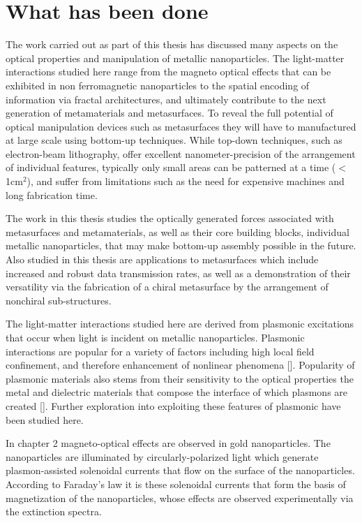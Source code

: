 \section{What has been done}
The work carried out as part of this thesis has discussed many aspects on the optical properties and manipulation of metallic nanoparticles. The light-matter interactions studied here range from the magneto optical effects that can be exhibited in non ferromagnetic nanoparticles to the spatial encoding of information via fractal architectures, and ultimately contribute to the next generation of metamaterials and metasurfaces. To reveal the full potential of optical manipulation devices such as metasurfaces they will have to manufactured at large scale using bottom-up techniques. While top-down techniques, such as electron-beam lithography, offer excellent nanometer-precision of the arrangement of individual features, typically only small areas can be patterned at a time ($<$1cm$^2$), and suffer from limitations such as the need for expensive machines and long fabrication time. 

The work in this thesis studies the optically generated forces associated with metasurfaces and metamaterials, as well as their core building blocks, individual metallic nanoparticles, that may make bottom-up assembly possible in the future. Also studied in this thesis are applications to metasurfaces which include increased and robust data transmission rates, as well as a demonstration of their versatility via the fabrication of a chiral metasurface by the arrangement of nonchiral sub-structures.

The light-matter interactions studied here are derived from plasmonic excitations that occur when light is incident on metallic nanoparticles. Plasmonic interactions are popular for a variety of factors including high local field confinement, and therefore enhancement of nonlinear phenomena [\cite{Novotny2011, Kauranen}]. Popularity of plasmonic materials also stems from their sensitivity to the optical properties the metal and dielectric materials that compose the interface of which plasmons are created [\cite{Homola}]. Further exploration into exploiting these features of plasmonic have been studied here. 

In chapter 2 magneto-optical effects are observed in gold nanoparticles. The nanoparticles are illuminated by circularly-polarized light which generate plasmon-assisted solenoidal currents that flow on the surface of the nanoparticles. According to Faraday's law it is these solenoidal currents that form the basis of magnetization of the nanoparticles, whose effects are observed experimentally via the extinction spectra.

